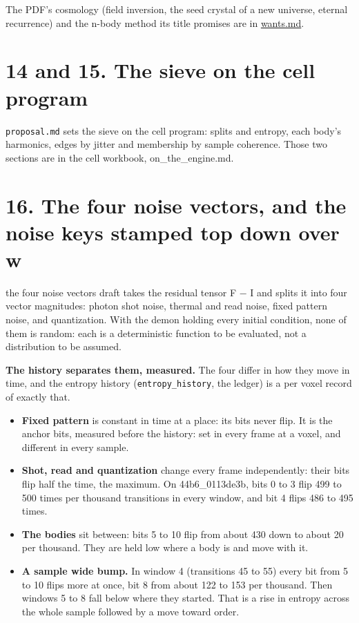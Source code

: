 The PDF's cosmology (field inversion, the seed crystal of a new universe, eternal recurrence) and the n-body method its title promises are in \hyperref[chap:wants]{wants.md}.

\section{\texorpdfstring{14 and 15. The sieve on the cell program}{14 and 15. The sieve on the cell program}}

\texttt{proposal.\allowbreak{}md} sets the sieve on the cell program: splits and entropy, each body's harmonics, edges by jitter and membership by sample coherence. Those two sections are in the cell workbook, on\_\allowbreak{}the\_\allowbreak{}engine.md.

\section{\texorpdfstring{16. The four noise vectors, and the noise keys stamped top down over w}{16. The four noise vectors, and the noise keys stamped top down over w}}

the four noise vectors draft takes the residual tensor F − I and splits it into four vector magnitudes: photon shot noise, thermal and read noise, fixed pattern noise, and quantization. With the demon holding every initial condition, none of them is random: each is a deterministic function to be evaluated, not a distribution to be assumed.

\textbf{The history separates them, measured.} The four differ in how they move in time, and the entropy history (\texttt{entropy\_\allowbreak{}history}, the ledger) is a per voxel record of exactly that.

\begin{itemize}
\item \textbf{Fixed pattern} is constant in time at a place: its bits never flip. It is the anchor bits, measured before the history: set in every frame at a voxel, and different in every sample.
\item \textbf{Shot, read and quantization} change every frame independently: their bits flip half the time, the maximum. On 44b6\_\allowbreak{}0113de3b, bits 0 to 3 flip 499 to 500 times per thousand transitions in every window, and bit 4 flips 486 to 495 times.
\item \textbf{The bodies} sit between: bits 5 to 10 flip from about 430 down to about 20 per thousand. They are held low where a body is and move with it.
\item \textbf{A sample wide bump.} In window 4 (transitions 45 to 55) every bit from 5 to 10 flips more at once, bit 8 from about 122 to 153 per thousand. Then windows 5 to 8 fall below where they started. That is a rise in entropy across the whole sample followed by a move toward order.
\end{itemize}

